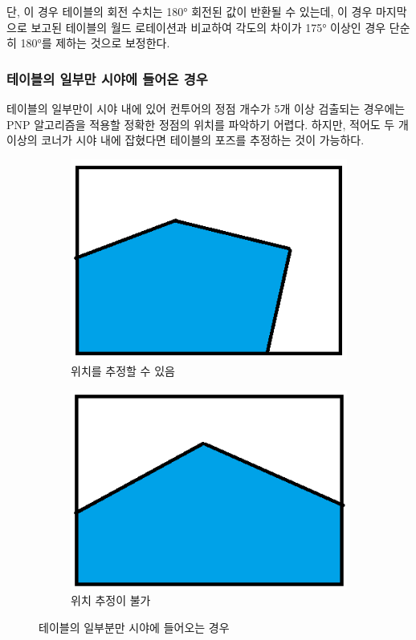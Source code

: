 \documentclass[11pt]{oblivoir}
\begin{document}
단, 이 경우 테이블의 회전 수치는 180\si{\degree} 회전된 값이 반환될 수 있는데, 이 경우 마지막으로 보고된 테이블의 월드 로테이션과 비교하여 각도의 차이가 175\si{\degree} 이상인 경우 단순히 180\si{\degree}를 제하는 것으로 보정한다.

\subsubsection{테이블의 일부만 시야에 들어온 경우}

테이블의 일부만이 시야 내에 있어 컨투어의 정점 개수가 5개 이상 검출되는 경우에는 PNP 알고리즘을 적용할 정확한 정점의 위치를 파악하기 어렵다. 하지만, 적어도 두 개 이상의 코너가 시야 내에 잡혔다면 테이블의 포즈를 추정하는 것이 가능하다.

\begin{figure}[h]
        \centering
        \begin{subfigure}{0.4\textwidth}
                \includegraphics[width=\textwidth]{img/partial-table-valid-case.png}
                \caption{위치를 추정할 수 있음}
        \end{subfigure}
        \centering
        \begin{subfigure}{0.4\textwidth}
                \includegraphics[width=\textwidth]{img/partial-table-invalid-case.png}
                \caption{위치 추정이 불가}
        \end{subfigure}
        \caption{테이블의 일부분만 시야에 들어오는 경우}
\end{figure}
\end{document}
